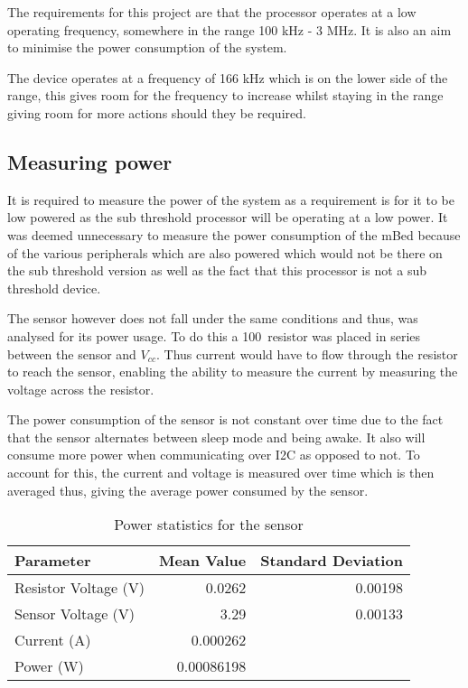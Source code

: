 
The requirements for this project are that the processor operates at a low operating frequency, somewhere in the range 100 kHz - 3 MHz. It is also an aim to minimise the power consumption of the system. 

The device operates at a frequency of 166 kHz which is on the lower side of the range, this gives room for the frequency to increase whilst staying in the range giving room for more actions should they be required.

\subsection{Measuring power}

It is required to measure the power of the system as a requirement is for it to be low powered as the sub threshold processor will be operating at a low power. It was deemed unnecessary to measure the power consumption of the mBed because of the various peripherals which are also powered which would not be there on the sub threshold version as well as the fact that this processor is not a sub threshold device. 

The sensor however does not fall under the same conditions and thus, was analysed for its power usage. To do this a 100\ohm ~resistor was placed in series between the sensor and $V_{cc}$. Thus current would have to flow through the resistor to reach the sensor, enabling the ability to measure the current by measuring the voltage across the resistor.

The power consumption of the sensor is not constant over time due to the fact that the sensor alternates between sleep mode and being awake. It also will consume more power when communicating over I2C as opposed to not. To account for this, the current and voltage is measured over time which is then averaged thus, giving the average power consumed by the sensor.

\begin{table}
    \centering
    \begin{tabular}{|l|r|r|}
        \hline
        Parameter & Mean Value & Standard Deviation \\
        \hline
        Resistor Voltage (V) & 0.0262 & 0.00198 \\
        Sensor Voltage (V) & 3.29 & 0.00133 \\
        Current (A) & 0.000262 & \\
        Power (W) & 0.00086198 & \\
        \hline
    \end{tabular}
    \caption{Power statistics for the sensor}
    \label{tab:power}
\end{table}

